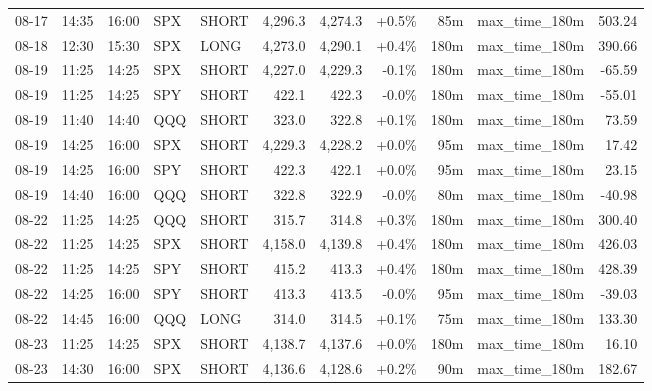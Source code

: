 \documentclass[11pt,a4paper,twoside]{article}
\begin{document}
\begin{center}
\begin{longtable}{>{\color{txtmain}}l l l l l r r r r >{\color{txtmain}}l r}
08-17 & 14:35 & 16:00 & SPX & SHORT & 4,296.3 & 4,274.3 & \textcolor{wingreen}{+0.5\%} & 85m & max\_time\_180m & \textcolor{wingreen}{503.24} \\
08-18 & 12:30 & 15:30 & SPX & LONG & 4,273.0 & 4,290.1 & \textcolor{wingreen}{+0.4\%} & 180m & max\_time\_180m & \textcolor{wingreen}{390.66} \\
08-19 & 11:25 & 14:25 & SPX & SHORT & 4,227.0 & 4,229.3 & \textcolor{lossred}{-0.1\%} & 180m & max\_time\_180m & \textcolor{lossred}{-65.59} \\
08-19 & 11:25 & 14:25 & SPY & SHORT & 422.1 & 422.3 & \textcolor{lossred}{-0.0\%} & 180m & max\_time\_180m & \textcolor{lossred}{-55.01} \\
08-19 & 11:40 & 14:40 & QQQ & SHORT & 323.0 & 322.8 & \textcolor{wingreen}{+0.1\%} & 180m & max\_time\_180m & \textcolor{wingreen}{73.59} \\
08-19 & 14:25 & 16:00 & SPX & SHORT & 4,229.3 & 4,228.2 & \textcolor{wingreen}{+0.0\%} & 95m & max\_time\_180m & \textcolor{wingreen}{17.42} \\
08-19 & 14:25 & 16:00 & SPY & SHORT & 422.3 & 422.1 & \textcolor{wingreen}{+0.0\%} & 95m & max\_time\_180m & \textcolor{wingreen}{23.15} \\
08-19 & 14:40 & 16:00 & QQQ & SHORT & 322.8 & 322.9 & \textcolor{lossred}{-0.0\%} & 80m & max\_time\_180m & \textcolor{lossred}{-40.98} \\
08-22 & 11:25 & 14:25 & QQQ & SHORT & 315.7 & 314.8 & \textcolor{wingreen}{+0.3\%} & 180m & max\_time\_180m & \textcolor{wingreen}{300.40} \\
08-22 & 11:25 & 14:25 & SPX & SHORT & 4,158.0 & 4,139.8 & \textcolor{wingreen}{+0.4\%} & 180m & max\_time\_180m & \textcolor{wingreen}{426.03} \\
08-22 & 11:25 & 14:25 & SPY & SHORT & 415.2 & 413.3 & \textcolor{wingreen}{+0.4\%} & 180m & max\_time\_180m & \textcolor{wingreen}{428.39} \\
08-22 & 14:25 & 16:00 & SPY & SHORT & 413.3 & 413.5 & \textcolor{lossred}{-0.0\%} & 95m & max\_time\_180m & \textcolor{lossred}{-39.03} \\
08-22 & 14:45 & 16:00 & QQQ & LONG & 314.0 & 314.5 & \textcolor{wingreen}{+0.1\%} & 75m & max\_time\_180m & \textcolor{wingreen}{133.30} \\
08-23 & 11:25 & 14:25 & SPX & SHORT & 4,138.7 & 4,137.6 & \textcolor{wingreen}{+0.0\%} & 180m & max\_time\_180m & \textcolor{wingreen}{16.10} \\
08-23 & 14:30 & 16:00 & SPX & SHORT & 4,136.6 & 4,128.6 & \textcolor{wingreen}{+0.2\%} & 90m & max\_time\_180m & \textcolor{wingreen}{182.67} \\

\end{longtable}
\end{center}
\end{document}

